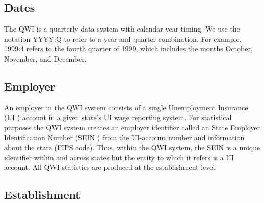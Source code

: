                       

%
%




\subsection{Dates}


The QWI is a quarterly data system with calendar year timing.  We use the
notation YYYY:Q to refer to a year and quarter combination. For example,
1999:4 refers to the fourth quarter of 1999, which includes the months
October, November, and December.

\subsection{Employer}


An employer in the QWI system consists of a single Unemployment Insurance (UI%
) account in a given state's UI wage reporting system. For
statistical purposes the QWI system creates an employer identifier called an
State Employer Identification Number (SEIN%
) from the UI-account number and information about the state
(FIPS%
 code). Thus, within the QWI system, the SEIN is a unique
identifier within and across states but the entity to which it refers is a
UI account. All QWI statistics are produced at the establishment level.

\subsection{Establishment}


